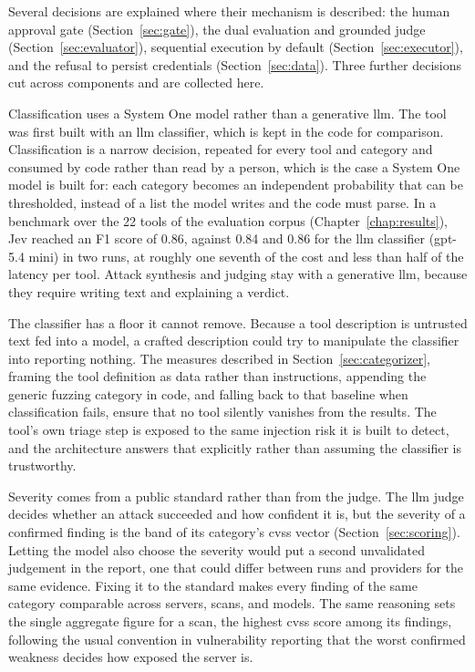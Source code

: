 Several decisions are explained where their mechanism is described: the human approval gate (Section~\ref{sec:gate}), the dual evaluation and grounded judge (Section~\ref{sec:evaluator}), sequential execution by default (Section~\ref{sec:executor}), and the refusal to persist credentials (Section~\ref{sec:data}). Three further decisions cut across components and are collected here.

Classification uses a System One model rather than a generative \gls{llm}. The tool was first built with an \gls{llm} classifier, which is kept in the code for comparison. Classification is a narrow decision, repeated for every tool and category and consumed by code rather than read by a person, which is the case a System One model is built for: each category becomes an independent probability that can be thresholded, instead of a list the model writes and the code must parse. In a benchmark over the 22 tools of the evaluation corpus (Chapter~\ref{chap:results}), Jev reached an F1 score of 0.86, against 0.84 and 0.86 for the \gls{llm} classifier (\gls{gpt}-5.4 mini) in two runs, at roughly one seventh of the cost and less than half of the latency per tool. Attack synthesis and judging stay with a generative \gls{llm}, because they require writing text and explaining a verdict.

The classifier has a floor it cannot remove. Because a tool description is untrusted text fed into a model, a crafted description could try to manipulate the classifier into reporting nothing. The measures described in Section~\ref{sec:categorizer}, framing the tool definition as data rather than instructions, appending the generic fuzzing category in code, and falling back to that baseline when classification fails, ensure that no tool silently vanishes from the results. The tool's own triage step is exposed to the same injection risk it is built to detect, and the architecture answers that explicitly rather than assuming the classifier is trustworthy.

Severity comes from a public standard rather than from the judge. The \gls{llm} judge decides whether an attack succeeded and how confident it is, but the severity of a confirmed finding is the band of its category's \gls{cvss} vector (Section~\ref{sec:scoring}). Letting the model also choose the severity would put a second unvalidated judgement in the report, one that could differ between runs and providers for the same evidence. Fixing it to the standard makes every finding of the same category comparable across servers, scans, and models. The same reasoning sets the single aggregate figure for a scan, the highest \gls{cvss} score among its findings, following the usual convention in vulnerability reporting that the worst confirmed weakness decides how exposed the server is.

